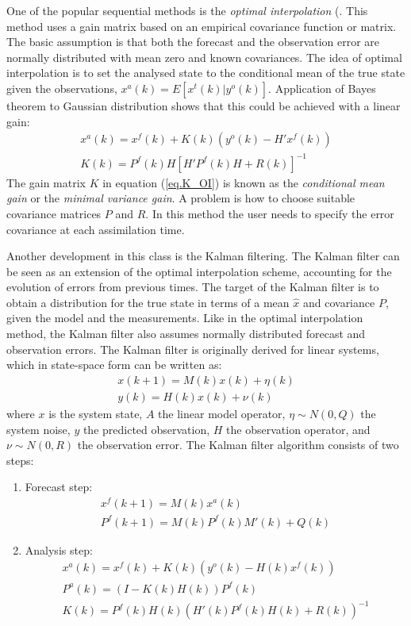 One of the popular sequential methods is the \emph{optimal interpolation} (\cite{Daley1991}. This method uses a gain matrix based on an empirical covariance
function or matrix. The basic assumption is that both the forecast and the
observation error are normally distributed with mean zero and known
covariances. The idea of optimal interpolation is to set the analysed state to
the conditional mean of the true state given the observations,
$x^a(k)=E[x^t(k)|y^o(k)]$. Application of Bayes theorem to Gaussian
distribution shows that this could be achieved with a linear gain:
\begin{eqnarray}
x^a(k)=x^f(k)+K(k)(y^o(k)-H'x^f(k)) \\
K(k)=P^f(k) H [H' P^f(k) H + R(k)]^{-1} \label{eq.K_OI}
\end{eqnarray}
The gain matrix $K$ in equation (\ref{eq.K_OI}) is known as the
\emph{conditional mean gain} or the \emph{minimal variance gain}. A problem is
how to choose suitable covariance matrices $P$ and $R$. In this method the user
needs to specify the error covariance at each assimilation time.

Another development in this class is the Kalman filtering. The Kalman filter
can be seen as an extension of the optimal interpolation scheme, accounting for
the evolution of errors from previous times. The target of the Kalman filter is
to obtain a distribution for the true state in terms of a mean $\hat{x}$ and
covariance $P$, given the model and the measurements. Like in the optimal
interpolation method, the Kalman filter also assumes normally distributed
forecast and observation errors. The Kalman filter is originally derived for
linear systems, which in state-space form can be written as:
\begin{eqnarray}
x(k+1)= M(k) x(k) + \eta(k) \\
y(k) = H(k) x(k) + \nu(k)
\end{eqnarray}
where $x$ is the system state, $A$ the linear model operator, $\eta \sim
N(0,Q)$ the system noise, $y$ the predicted observation, $H$ the observation
operator, and $\nu \sim N(0,R)$ the observation error. The Kalman filter
algorithm consists of two steps:
\begin{enumerate}
\item Forecast step:
   \begin{eqnarray}
     x^f(k+1) = M(k) x^a(k) \\
     P^f(k+1) = M(k) P^f(k) M'(k) + Q(k)
   \end{eqnarray}
 \item Analysis step:
   \begin{eqnarray}
     x^a(k)=x^f(k) + K(k) (y^o(k) - H(k) x^f(k)) \\
     P^a(k)=(I-K(k) H(k)) P^f(k) \\
     K(k) = P^f(k) H(k) (H'(k) P^f(k) H(k) + R(k))^{-1}
   \end{eqnarray}
\end{enumerate}

